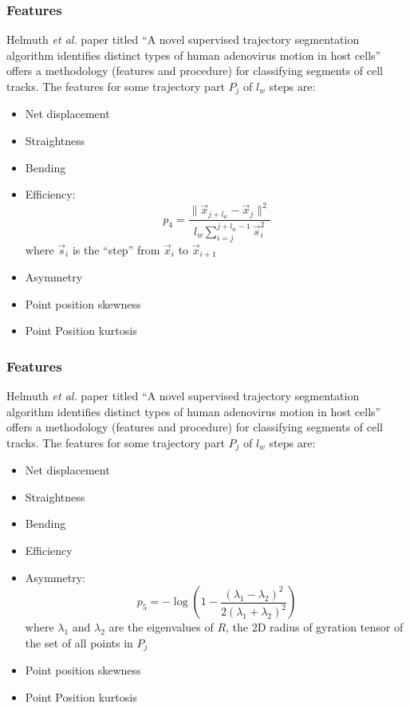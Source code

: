 \documentclass[8pt]{beamer}
\begin{document}
\begin{frame}
  \frametitle{Features}
  Helmuth \emph{et al.} paper titled ``A novel supervised trajectory
  segmentation algorithm identifies distinct types of human adenovirus
  motion in host cells'' offers a methodology (features and procedure)
  for classifying segments of cell tracks.
  The features for some trajectory part $P_j$ of $l_w$ steps are:
  \begin{itemize}
  \item Net displacement
  \item Straightness
  \item Bending
  \item Efficiency: 
    \begin{equation*}
      p_4 = \frac{\| \vec{x}_{j+l_w} - \vec{x}_j \|^2}{l_w
        \sum_{i=j}^{j + l_w - 1}\vec{s}_i^2}
    \end{equation*}
    where $\vec{s}_i$ is the ``step'' from $\vec{x}_i$ to $\vec{x}_{i+1}$
  \item Asymmetry
  \item Point position skewness
  \item Point Position kurtosis
  \end{itemize}
\end{frame}

% 
\begin{frame}
  \frametitle{Features}
  Helmuth \emph{et al.} paper titled ``A novel supervised trajectory
  segmentation algorithm identifies distinct types of human adenovirus
  motion in host cells'' offers a methodology (features and procedure)
  for classifying segments of cell tracks.
  The features for some trajectory part $P_j$ of $l_w$ steps are:
  \begin{itemize}
  \item Net displacement
  \item Straightness
  \item Bending
  \item Efficiency
  \item Asymmetry: 
    \begin{equation*}
      p_5 = -\log \left( 1 -
        \frac{(\lambda_1-\lambda_2)^2}{2(\lambda_1 + \lambda_2)^2} \right)
    \end{equation*}
    where $\lambda_1$ and $\lambda_2$ are the eigenvalues of $R$, the 2D radius of
    gyration tensor of the set of all points in $P_j$
  \item Point position skewness
  \item Point Position kurtosis
  \end{itemize}
\end{frame}
\end{document}
